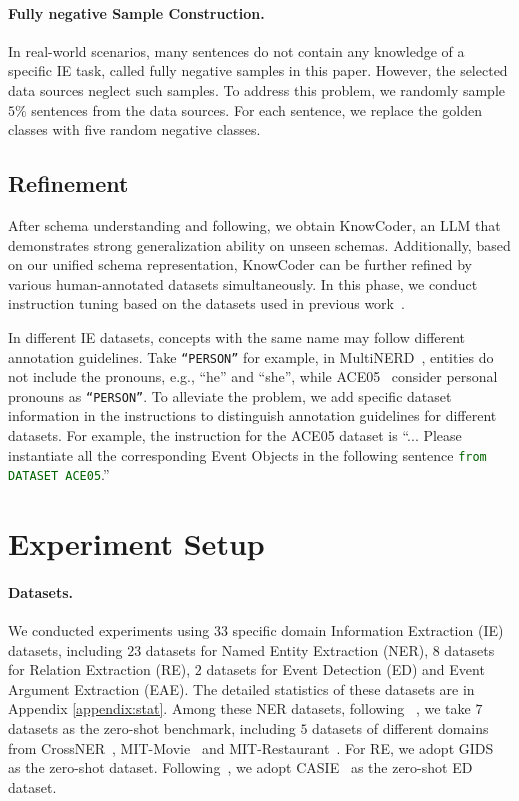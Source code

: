 \paragraph{Fully negative Sample Construction.} In real-world scenarios, many sentences do not contain any knowledge of a specific IE task, called fully negative samples in this paper. However, the selected data sources neglect such samples. To address this problem, we randomly sample $5\%$ sentences from the data sources. For each sentence, we replace the golden classes with five random negative classes.

\subsection{Refinement}

After schema understanding and following, we obtain KnowCoder, an LLM that demonstrates strong generalization ability on unseen schemas. Additionally, based on our unified schema representation, KnowCoder can be further refined by various human-annotated datasets simultaneously. In this phase, we conduct instruction tuning based on the datasets used in previous work~\cite{wang2023instructuie, sainz2023gollie}.

In different IE datasets, concepts with the same name may follow different annotation guidelines. Take \texttt{``\textcolor{darkgreen}{PERSON}''} for example, in MultiNERD~\cite{multiNERD_DATASET}, entities do not include the pronouns, e.g., ``he'' and ``she'', while ACE05~\cite{ACE2005_DATASET} consider personal pronouns as \texttt{``\textcolor{darkgreen}{PERSON}''}. To alleviate the problem, we add specific dataset information in the instructions to distinguish annotation guidelines for different datasets. For example, the instruction for the ACE05 dataset is ``... Please instantiate all the corresponding Event Objects in the following sentence \texttt{\textcolor{darkgreen}{from DATASET ACE05}}.''

\section{Experiment Setup}

\paragraph{Datasets.}
We conducted experiments using $33$ specific domain Information Extraction (IE) datasets, including $23$ datasets for Named Entity Extraction (NER), $8$ datasets for Relation Extraction (RE), $2$ datasets for Event Detection (ED) and Event Argument Extraction (EAE). The detailed statistics of these datasets are in Appendix \ref{appendix:stat}. Among these NER datasets, following ~\citet{wang2023instructuie, zhou2023universalner}, we take $7$ datasets as the zero-shot benchmark, including $5$ datasets of different domains from CrossNER~\cite{CrossNERDATASET}, MIT-Movie~\cite{MITReviewDataset} and MIT-Restaurant~\cite{MITReviewDataset}. For RE, we adopt GIDS~\cite{Jat2018ImprovingDS} as the zero-shot dataset. Following~\cite{sainz2023gollie}, we adopt CASIE~\cite{Lu2021Text2EventCS} as the zero-shot ED dataset.

